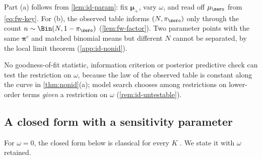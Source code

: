 Part (a) follows from \cref{lem:id-param}: fix $\bm\mu_+$, vary $\omega$, and read off $\mu_{\zero}$ from \eqref{eq:fw-key}. For (b), the observed table informs $(N,\pi_{\zero})$ only through the count $n\sim\Bin(N,1-\pi_{\zero})$ (\cref{lem:fw-factor}). Two parameter points with the same $\bm\pi^c$ and matched binomial means but different $N$ cannot be separated, by the local limit theorem (\cref{app:id-nonid}).

No goodness-of-fit statistic, information criterion or posterior predictive check can test the restriction on $\omega$, because the law of the observed table is constant along the curve in \cref{thm:nonid}(a); model search chooses among restrictions on lower-order terms \emph{given} a restriction on $\omega$ (\cref{rem:id-untestable}).

\subsection{A closed form with a sensitivity parameter}\label{sec:id-closed}

For $\omega=0$, the closed form below is classical for every $K$ \citep{fienberg1972,bishop1975}. We state it with $\omega$ retained.

